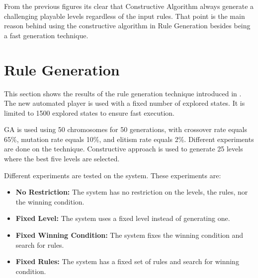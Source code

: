 



From the previous figures its clear that Constructive Algorithm always generate a challenging playable levels regardless of the input rules. That point is the main reason behind using the constructive algorithm in Rule Generation besides being a fast generation technique.

\section{Rule Generation}
This section shows the results of the rule generation technique introduced in . The new automated player is used with a fixed number of explored states. It is limited to 1500 explored states to ensure fast execution.\\\par

GA is used using 50 chromosomes for 50 generations, with crossover rate equals 65\%, mutation rate equals 10\%, and elitism rate equals 2\%. Different experiments are done on the technique. Constructive approach is used to generate 25 levels where the best five levels are selected.\\\par

Different experiments are tested on the system. These experiments are:
\begin{itemize}
	\item \textbf{No Restriction:} The system has no restriction on the levels, the rules, nor the winning condition.
	\item \textbf{Fixed Level:} The system uses a fixed level instead of generating one.
	\item \textbf{Fixed Winning Condition:} The system fixes the winning condition and search for rules.
	\item \textbf{Fixed Rules:} The system has a fixed set of rules and search for winning condition. 
\end{itemize}

